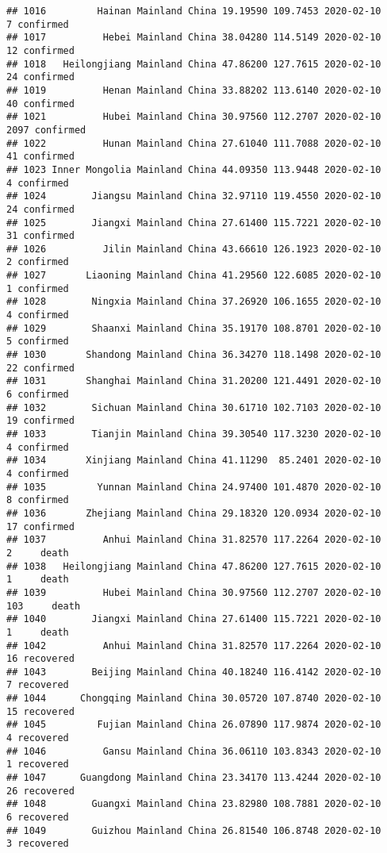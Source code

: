 \documentclass[
]{article}
\begin{document}
\begin{verbatim}
## 1016         Hainan Mainland China 19.19590 109.7453 2020-02-10     7 confirmed
## 1017          Hebei Mainland China 38.04280 114.5149 2020-02-10    12 confirmed
## 1018   Heilongjiang Mainland China 47.86200 127.7615 2020-02-10    24 confirmed
## 1019          Henan Mainland China 33.88202 113.6140 2020-02-10    40 confirmed
## 1021          Hubei Mainland China 30.97560 112.2707 2020-02-10  2097 confirmed
## 1022          Hunan Mainland China 27.61040 111.7088 2020-02-10    41 confirmed
## 1023 Inner Mongolia Mainland China 44.09350 113.9448 2020-02-10     4 confirmed
## 1024        Jiangsu Mainland China 32.97110 119.4550 2020-02-10    24 confirmed
## 1025        Jiangxi Mainland China 27.61400 115.7221 2020-02-10    31 confirmed
## 1026          Jilin Mainland China 43.66610 126.1923 2020-02-10     2 confirmed
## 1027       Liaoning Mainland China 41.29560 122.6085 2020-02-10     1 confirmed
## 1028        Ningxia Mainland China 37.26920 106.1655 2020-02-10     4 confirmed
## 1029        Shaanxi Mainland China 35.19170 108.8701 2020-02-10     5 confirmed
## 1030       Shandong Mainland China 36.34270 118.1498 2020-02-10    22 confirmed
## 1031       Shanghai Mainland China 31.20200 121.4491 2020-02-10     6 confirmed
## 1032        Sichuan Mainland China 30.61710 102.7103 2020-02-10    19 confirmed
## 1033        Tianjin Mainland China 39.30540 117.3230 2020-02-10     4 confirmed
## 1034       Xinjiang Mainland China 41.11290  85.2401 2020-02-10     4 confirmed
## 1035         Yunnan Mainland China 24.97400 101.4870 2020-02-10     8 confirmed
## 1036       Zhejiang Mainland China 29.18320 120.0934 2020-02-10    17 confirmed
## 1037          Anhui Mainland China 31.82570 117.2264 2020-02-10     2     death
## 1038   Heilongjiang Mainland China 47.86200 127.7615 2020-02-10     1     death
## 1039          Hubei Mainland China 30.97560 112.2707 2020-02-10   103     death
## 1040        Jiangxi Mainland China 27.61400 115.7221 2020-02-10     1     death
## 1042          Anhui Mainland China 31.82570 117.2264 2020-02-10    16 recovered
## 1043        Beijing Mainland China 40.18240 116.4142 2020-02-10     7 recovered
## 1044      Chongqing Mainland China 30.05720 107.8740 2020-02-10    15 recovered
## 1045         Fujian Mainland China 26.07890 117.9874 2020-02-10     4 recovered
## 1046          Gansu Mainland China 36.06110 103.8343 2020-02-10     1 recovered
## 1047      Guangdong Mainland China 23.34170 113.4244 2020-02-10    26 recovered
## 1048        Guangxi Mainland China 23.82980 108.7881 2020-02-10     6 recovered
## 1049        Guizhou Mainland China 26.81540 106.8748 2020-02-10     3 recovered

\end{verbatim}
\end{document}
